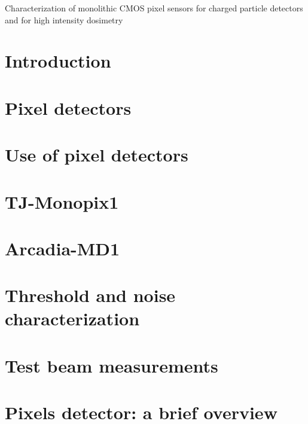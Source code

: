 \documentclass[a4paper]{report}
\begin{document}
\linenumbers

\tableofcontents

Characterization of monolithic CMOS pixel sensors for charged particle detectors and for high intensity dosimetry 

\chapter{Introduction}


\chapter{Pixel detectors}


\chapter{Use of pixel detectors}


\chapter{TJ-Monopix1}


\chapter{Arcadia-MD1}


\chapter{Threshold and noise characterization}


\chapter{Test beam measurements}



\appendix
\chapter{Pixels detector: a brief overview}




\printbibliography[heading=bibintoc, title={Bibliography}] 
\end{document}
